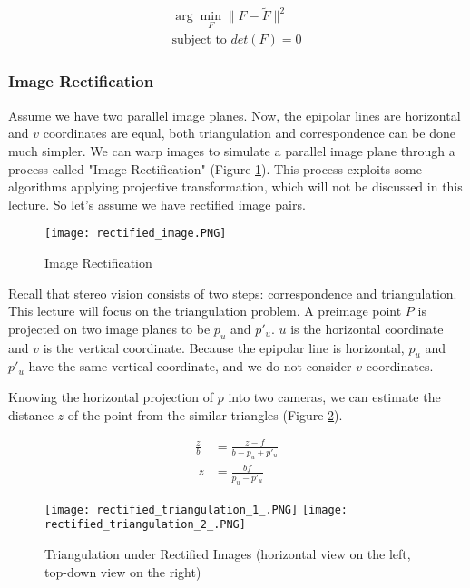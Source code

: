 \documentclass[twoside]{article}
\begin{document}
\begin{align}
\arg\!\min_F \|F-\tilde{F}\|^2 \\
\text{subject to } det(F) = 0
\end{align}

\subsubsection{Image Rectification}

Assume we have two parallel image planes. Now, the epipolar lines are horizontal and $v$ coordinates are equal, both triangulation and correspondence can be done much simpler. We can warp images to simulate a parallel image plane through a process called "Image Rectification" (Figure \ref{rect}). This process exploits some algorithms applying projective transformation, which will not be discussed in this lecture. So let's assume we have rectified image pairs.

\begin{figure}[h!]
  \begin{center}
	\texttt{[image: rectified\_image.PNG]}  \end{center}
  \caption{Image Rectification}
  \label{rect}
\end{figure}

Recall that stereo vision consists of two steps: correspondence and triangulation. This lecture will focus on the triangulation problem. A preimage point $P$ is projected on two image planes to be $p_u$ and $p'_u$. $u$ is the horizontal coordinate and $v$ is the vertical coordinate. Because the epipolar line is horizontal, $p_u$ and $p'_u$ have the same vertical coordinate, and we do not consider $v$ coordinates.

Knowing the horizontal projection of $p$ into two cameras, we can estimate the distance $z$ of the point from the similar triangles (Figure \ref{recttri}).

\begin{align}
  \frac{z}{b} &= \frac{z-f}{b-p_u+p'_u} \\
  \ z &= \frac{bf}{p_u-p'_u}
\end{align}

\begin{figure}[h!]
  \begin{center}
	\texttt{[image: rectified\_triangulation\_1\_.PNG]}
	\texttt{[image: rectified\_triangulation\_2\_.PNG]}  \end{center}
  \caption{Triangulation under Rectified Images (horizontal view on the left, top-down view on the right)}
  \label{recttri}
\end{figure}
\end{document}
